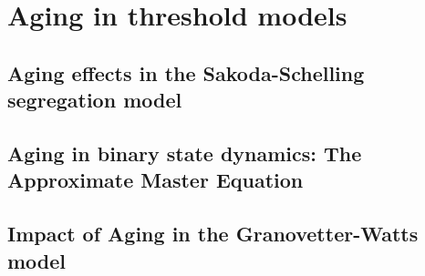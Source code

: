 \documentclass[
	10pt, %
	a4paper,
]{LegrandOrangeBook}
\begin{document}

\part{Aging in threshold models}

\chapterspaceabove{6.75cm}
\chapterspacebelow{7.25cm}

\chapter{\label{ch:Aging effects in the Sakoda-Schelling segregation model} Aging effects in the Sakoda-Schelling segregation model}


\chapterspaceabove{6.75cm}
\chapterspacebelow{7.25cm}

\chapter{\label{ch:Aging in binary state dynamics} Aging in binary state dynamics: The Approximate Master Equation}


\chapterspaceabove{6.75cm}
\chapterspacebelow{7.25cm}

\chapter{\label{ch:Aging in the Granovetter-Watts model} Impact of Aging in the Granovetter-Watts model}


\renewcommand{\thechapter}{6A} %
\chapterspaceabove{6.75cm}
\chapterspacebelow{7.25cm}
\end{document}
